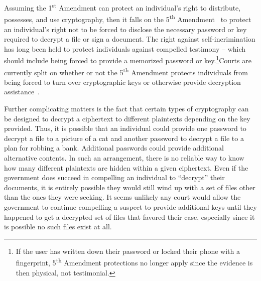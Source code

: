 Assuming the 1\textsuperscript{st} Amendment can protect an
individual's right to distribute, possesses, and use cryptography,
then it falls on the 5\textsuperscript{th}
Amendment~\cite{us-constitution-amend5} to protect an individual's
right not to be forced to disclose the necessary password or key
required to decrypt a file or sign a document. The right against
self-incrimination has long been held to protect individuals against
compelled testimony -- which should include being forced to provide a
memorized password or key.\footnote{If the user has written down their
  password or locked their phone with a fingerprint,
  5\textsuperscript{th} Amendment protections no longer apply since
  the evidence is then physical, not testimonial.}Courts are currently
split on whether or not the 5\textsuperscript{th} Amendment protects
individuals from being forced to turn over cryptographic keys or
otherwise provide decryption assistance~\cite{usvboucher,
  commonwealthvgelfgatt, usvdoe}.

Further complicating matters is the fact that certain types of
cryptography can be designed to decrypt a ciphertext to different
plaintexts depending on the key provided. Thus, it is possible that an
individual could provide one password to decrypt a file to a picture
of a cat and another password to decrypt a file to a plan for robbing
a bank. Additional passwords could provide additional alternative
contents. In such an arrangement, there is no reliable way to know how
many different plaintexts are hidden within a given ciphertext. Even
if the government does succeed in compelling an individual to
``decrypt'' their documents, it is entirely possible they would still
wind up with a set of files other than the ones they were seeking.  It
seems unlikely any court would allow the government to continue
compelling a suspect to provide additional keys until they happened to
get a decrypted set of files that favored their case, especially since
it is possible no such files exist at all.

